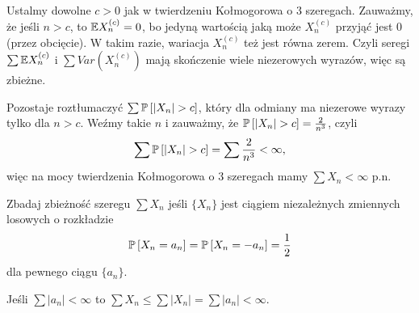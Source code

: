 \documentclass{article}
\begin{document}
Ustalmy dowolne $c>0$ jak w twierdzeniu Kołmogorowa o 3 szeregach. Zauważmy, że jeśli $n>c$, to $\mathbb{E} X_n^{(c)}=0$, bo jedyną wartością jaką może $X_n^{(c)}$ przyjąć jest $0$ (przez obcięcie). W takim razie, wariacja $X_n^{(c)}$ też jest równa zerem. Czyli seregi $\sum \mathbb{E} X_n^{(c)}$ i $\sum Var(X_n^{(c)})$ mają skończenie wiele niezerowych wyrazów, więc są zbieżne.

Pozostaje roztłumaczyć $\sum\prob{|X_n|>c}$, który dla odmiany ma niezerowe wyrazy tylko dla $n>c$. Weźmy takie $n$ i zauważmy, że $\prob{|X_n|>c}=\frac{2}{n^3}$, czyli
$$\sum \prob{|X_n|>c}=\sum\frac{2}{n^3}<\infty,$$
więc na mocy twierdzenia Kołmogorowa o 3 szeregach mamy $\sum X_n<\infty$ p.n.

\begin{problem}[10]{}
  Zbadaj zbieżność szeregu $\sum X_n$ jeśli $\{X_n\}$ jest ciągiem niezależnych zmiennych losowych o rozkładzie 
  $$\prob{X_n=a_n}=\prob{X_n=-a_n}=\frac12$$
  dla pewnego ciągu $\{a_n\}$.
\end{problem}

Jeśli $\sum |a_n|<\infty$ to $\sum X_n\leq\sum|X_n|=\sum|a_n|<\infty$.
\end{document}
